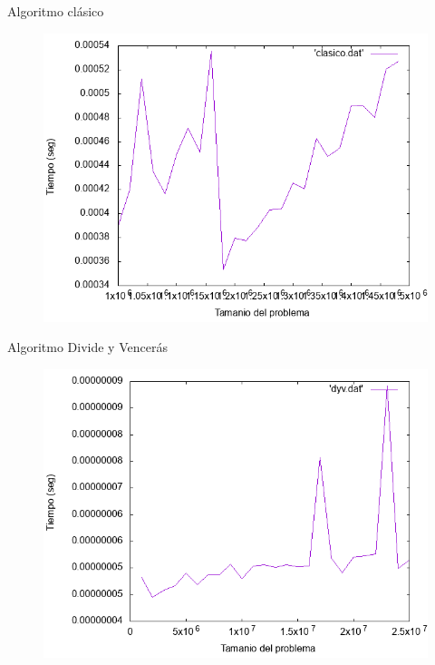 \documentclass{beamer}
\begin{document}
\begin{frame}[fragile]{Algoritmo clásico}
\begin{figure}[H]
\centering
\includegraphics[scale=0.5]{clasico.png}
\end{figure}
\end{frame}

\begin{frame}[fragile]{Algoritmo Divide y Vencerás}
\begin{figure}[H]
\centering
\includegraphics[scale=0.5]{dyv.png}
\end{figure}
\end{frame}
\end{document}
